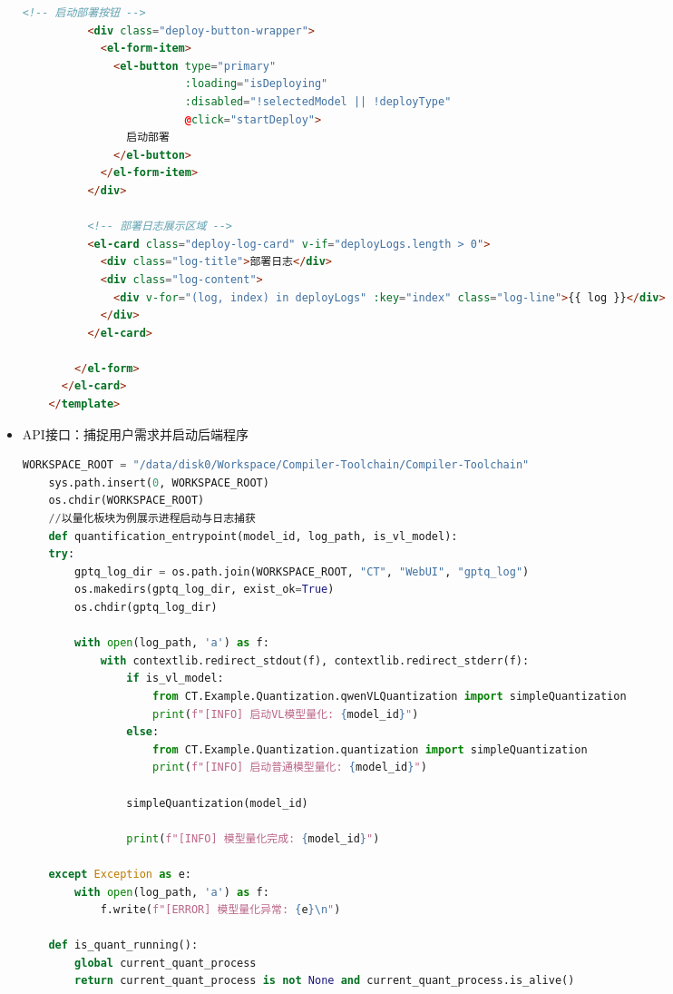 \documentclass[AutoFakeBold,AutoFakeSlant,language=chinese,degree=bachelor]{sustechthesis}
\begin{document}
\begin{itemize}
\begin{lstlisting}[language=HTML]
          <!-- 启动部署按钮 -->
          <div class="deploy-button-wrapper">
            <el-form-item>
              <el-button type="primary"
                         :loading="isDeploying"
                         :disabled="!selectedModel || !deployType"
                         @click="startDeploy">
                启动部署
              </el-button>
            </el-form-item>
          </div>
    
          <!-- 部署日志展示区域 -->
          <el-card class="deploy-log-card" v-if="deployLogs.length > 0">
            <div class="log-title">部署日志</div>
            <div class="log-content">
              <div v-for="(log, index) in deployLogs" :key="index" class="log-line">{{ log }}</div>
            </div>
          </el-card>
    
        </el-form>
      </el-card>
    </template>
    \end{lstlisting}

    \item API接口：捕捉用户需求并启动后端程序
    \begin{lstlisting}[language=python]
    WORKSPACE_ROOT = "/data/disk0/Workspace/Compiler-Toolchain/Compiler-Toolchain"
    sys.path.insert(0, WORKSPACE_ROOT)
    os.chdir(WORKSPACE_ROOT) 
    //以量化板块为例展示进程启动与日志捕获
    def quantification_entrypoint(model_id, log_path, is_vl_model):
    try:
        gptq_log_dir = os.path.join(WORKSPACE_ROOT, "CT", "WebUI", "gptq_log")
        os.makedirs(gptq_log_dir, exist_ok=True)
        os.chdir(gptq_log_dir)
    
        with open(log_path, 'a') as f:
            with contextlib.redirect_stdout(f), contextlib.redirect_stderr(f):
                if is_vl_model:
                    from CT.Example.Quantization.qwenVLQuantization import simpleQuantization
                    print(f"[INFO] 启动VL模型量化: {model_id}")
                else:
                    from CT.Example.Quantization.quantization import simpleQuantization
                    print(f"[INFO] 启动普通模型量化: {model_id}")
                    
                simpleQuantization(model_id)

                print(f"[INFO] 模型量化完成: {model_id}")

    except Exception as e:
        with open(log_path, 'a') as f:
            f.write(f"[ERROR] 模型量化异常: {e}\n")
    
    def is_quant_running():
        global current_quant_process
        return current_quant_process is not None and current_quant_process.is_alive()
    

\end{lstlisting}
\end{itemize}
\end{document}
